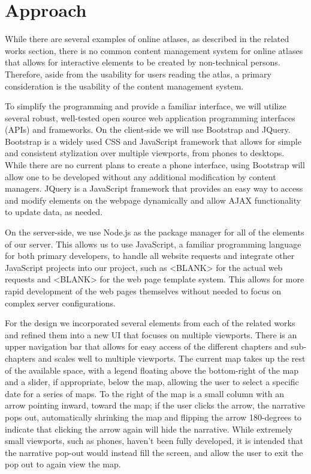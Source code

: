 \documentclass[11pt, draftcls, conference, onecolumn]{IEEEtran}
\begin{document}
\section{Approach}
While there are several examples of online atlases, as described in the related works section, there is no common content management system for online atlases that allows for interactive elements to be created by non-technical persons. Therefore, aside from the usability for users reading the atlas, a primary consideration is the usability of the content management system.

To simplify the programming and provide a familiar interface, we will utilize several robust, well-tested open source web application programming interfaces (APIs) and frameworks. On the client-side we will use Bootstrap and JQuery. Bootstrap is a widely used CSS and JavaScript framework that allows for simple and consistent stylization over multiple viewports, from phones to desktops. While there are no current plans to create a phone interface, using Bootstrap will allow one to be developed without any additional modification by content managers. JQuery is a JavaScript framework that provides an easy way to access and modify elements on the webpage dynamically and allow AJAX functionality to update data, as needed.

On the server-side, we use Node.js as the package manager for all of the elements of our server. This allows us to use JavaScript, a familiar programming language for both primary developers, to handle all website requests and integrate other JavaScript projects into our project, such as <BLANK> for the actual web requests and <BLANK> for the web page template system. This allows for more rapid development of the web pages themselves without needed to focus on complex server configurations.

For the design we incorporated several elements from each of the related works and refined them into a new UI that focuses on multiple viewports. There is an upper navigation bar that allows for easy access of the different chapters and sub-chapters and scales well to multiple viewports. The current map takes up the rest of the available space, with a legend floating above the bottom-right of the map and a slider, if appropriate, below the map, allowing the user to select a specific date for a series of maps. To the right of the map is a small column with an arrow pointing inward, toward the map; if the user clicks the arrow, the narrative pops out, automatically shrinking the map and flipping the arrow 180-degrees to indicate that clicking the arrow again will hide the narrative. While extremely small viewports, such as phones, haven't been fully developed, it is intended that the narrative pop-out would instead fill the screen, and allow the user to exit the pop out to again view the map.
\end{document}
